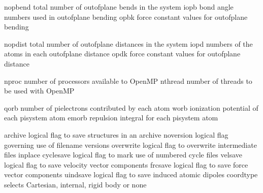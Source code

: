 \documentclass[letterpaper,11pt,english]{sphinxmanual}
\begin{document}

\begin{sphinxVerbatim}[commandchars=\\\{\}]
nopbend         total number of out\PYGZhy{}of\PYGZhy{}plane bends in the system
iopb            bond angle numbers used in out\PYGZhy{}of\PYGZhy{}plane bending
opbk            force constant values for out\PYGZhy{}of\PYGZhy{}plane bending
\end{sphinxVerbatim}


\begin{sphinxVerbatim}[commandchars=\\\{\}]
nopdist         total number of out\PYGZhy{}of\PYGZhy{}plane distances in the system
iopd            numbers of the atoms in each out\PYGZhy{}of\PYGZhy{}plane distance
opdk            force constant values for out\PYGZhy{}of\PYGZhy{}plane distance
\end{sphinxVerbatim}


\begin{sphinxVerbatim}[commandchars=\\\{\}]
nproc           number of processors available to OpenMP
nthread         number of threads to be used with OpenMP
\end{sphinxVerbatim}


\begin{sphinxVerbatim}[commandchars=\\\{\}]
qorb            number of pi\PYGZhy{}electrons contributed by each atom
worb            ionization potential of each pisystem atom
emorb           repulsion integral for each pisystem atom
\end{sphinxVerbatim}


\begin{sphinxVerbatim}[commandchars=\\\{\}]
archive         logical flag to save structures in an archive
noversion       logical flag governing use of filename versions
overwrite       logical flag to overwrite intermediate files inplace
cyclesave       logical flag to mark use of numbered cycle files
velsave         logical flag to save velocity vector components
frcsave         logical flag to save force vector components
uindsave        logical flag to save induced atomic dipoles
coordtype       selects Cartesian, internal, rigid body or none
\end{sphinxVerbatim}
\end{document}
